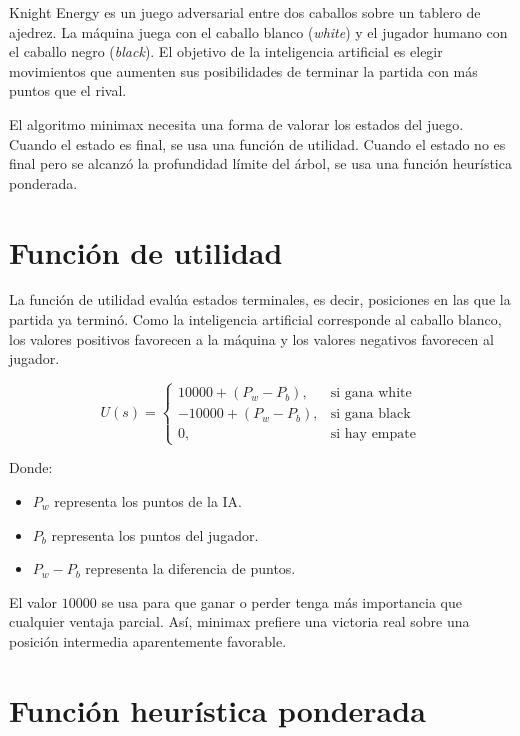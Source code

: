 \documentclass[12pt,letterpaper]{article}
\begin{document}
Knight Energy es un juego adversarial entre dos caballos sobre un tablero de ajedrez. La máquina juega con el caballo blanco (\textit{white}) y el jugador humano con el caballo negro (\textit{black}). El objetivo de la inteligencia artificial es elegir movimientos que aumenten sus posibilidades de terminar la partida con más puntos que el rival.

\begin{tcolorbox}[colframe=KEGold,title=\textbf{Idea central},coltitle=KEDark,colbacktitle=KEGold!35]
El algoritmo minimax necesita una forma de valorar los estados del juego. Cuando el estado es final, se usa una función de utilidad. Cuando el estado no es final pero se alcanzó la profundidad límite del árbol, se usa una función heurística ponderada.
\end{tcolorbox}

\section{Función de utilidad}

La función de utilidad evalúa estados terminales, es decir, posiciones en las que la partida ya terminó. Como la inteligencia artificial corresponde al caballo blanco, los valores positivos favorecen a la máquina y los valores negativos favorecen al jugador.

\[
U(s)=
\begin{cases}
10000 + (P_w - P_b), & \text{si gana white}\\
-10000 + (P_w - P_b), & \text{si gana black}\\
0, & \text{si hay empate}
\end{cases}
\]

\noindent Donde:

\begin{itemize}
    \item $P_w$ representa los puntos de la IA.
    \item $P_b$ representa los puntos del jugador.
    \item $P_w - P_b$ representa la diferencia de puntos.
\end{itemize}

El valor $10000$ se usa para que ganar o perder tenga más importancia que cualquier ventaja parcial. Así, minimax prefiere una victoria real sobre una posición intermedia aparentemente favorable.

\section{Función heurística ponderada}
\end{document}
